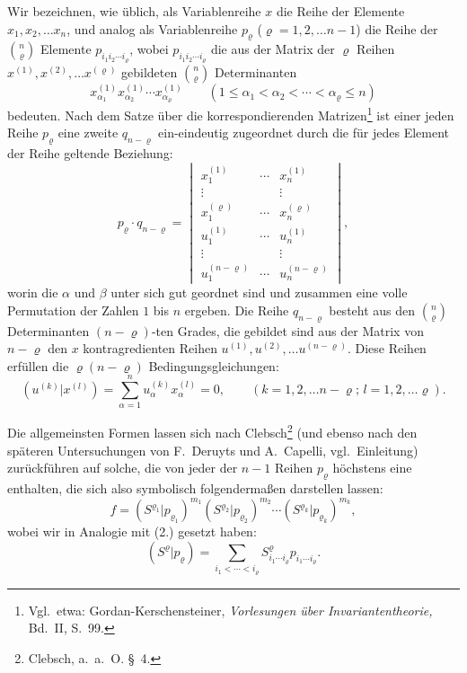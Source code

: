 \documentclass[12pt,a4paper]{article}
\begin{document}
Wir bezeichnen, wie üblich, als Variablenreihe $x$ die Reihe der Elemente $x_{1}, x_{2}, \ldots x_{n}$, und analog als Variablenreihe $p_{\varrho}$ ($\varrho = 1, 2, \ldots n-1$) die Reihe der $\binom{n}{\varrho}$ Elemente $p_{i_{1} i_{2} \cdots i_{\varrho}}$, wobei $p_{i_{1} i_{2} \cdots i_{\varrho}}$ die aus der Matrix der $\varrho$ Reihen $x^{(1)}, x^{(2)}, \ldots x^{(\varrho)}$ gebildeten $\binom{n}{\varrho}$ Determinanten
\begin{equation}\tag{1}
x^{(1)}_{\alpha_{1}} x^{(1)}_{\alpha_{2}} \cdots x^{(1)}_{\alpha_{\varrho}} \qquad (1 \leq \alpha_{1} < \alpha_{2} < \cdots < \alpha_{\varrho} \leq n)
\end{equation}
bedeuten. Nach dem Satze über die korrespondierenden Matrizen\footnote{Vgl.\ etwa: Gordan-Kerschensteiner, \textit{Vorlesungen über Invariantentheorie,} Bd.~II, S.~99.} ist einer jeden Reihe $p_{\varrho}$ eine zweite $q_{n-\varrho}$ ein-eindeutig zugeordnet durch die für jedes Element der Reihe geltende Beziehung:
\begin{equation}\tag{1$'$}
p_{\varrho} \cdot q_{n-\varrho} = \begin{vmatrix} x^{(1)}_{1} & \cdots & x^{(1)}_{n} \\ \vdots & & \vdots \\ x^{(\varrho)}_{1} & \cdots & x^{(\varrho)}_{n} \\ u^{(1)}_{1} & \cdots & u^{(1)}_{n} \\ \vdots & & \vdots \\ u^{(n-\varrho)}_{1} & \cdots & u^{(n-\varrho)}_{n} \end{vmatrix},
\end{equation}
worin die $\alpha$ und $\beta$ unter sich gut geordnet sind und zusammen eine volle Permutation der Zahlen $1$ bis $n$ ergeben. Die Reihe $q_{n-\varrho}$ besteht aus den $\binom{n}{\varrho}$ Determinanten $(n-\varrho)$-ten Grades, die gebildet sind aus der Matrix von $n-\varrho$ den $x$ kontragredienten Reihen $u^{(1)}, u^{(2)}, \ldots u^{(n-\varrho)}$. Diese Reihen erfüllen die $\varrho(n-\varrho)$ Bedingungsgleichungen:
\begin{equation}\tag{2}
(u^{(k)} | x^{(l)}) = \sum_{\alpha=1}^{n} u^{(k)}_{\alpha} x^{(l)}_{\alpha} = 0, \qquad (k = 1, 2, \ldots n-\varrho; \, l = 1, 2, \ldots \varrho).
\end{equation}

Die allgemeinsten Formen lassen sich nach Clebsch\footnote{Clebsch, a.\ a.\ O. \S\ 4.} (und ebenso nach den späteren Untersuchungen von F.\ Deruyts und A.\ Capelli, vgl.\ Einleitung) zurückführen auf solche, die von jeder der $n-1$ Reihen $p_{\varrho}$ höchstens eine enthalten, die sich also symbolisch folgendermaßen darstellen lassen:
\begin{equation}\tag{3}
f = (S^{\varrho_{1}} | p_{\varrho_{1}})^{m_{1}} (S^{\varrho_{2}} | p_{\varrho_{2}})^{m_{2}} \cdots (S^{\varrho_{k}} | p_{\varrho_{k}})^{m_{k}},
\end{equation}
wobei wir in Analogie mit (2.) gesetzt haben:
\begin{equation*}
(S^{\varrho} | p_{\varrho}) = \sum_{i_{1} < \cdots < i_{\varrho}} S^{\varrho}_{i_{1} \cdots i_{\varrho}} p_{i_{1} \cdots i_{\varrho}}.
\end{equation*}
\end{document}
